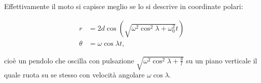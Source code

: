 \documentclass[../main.tex]{subfiles}
\begin{document}
Effettivamente il moto si capisce meglio se lo si descrive in coordinate polari:

\begin{align*}
	r &=  2d\cos\left(\sqrt{\omega^2\cos^2 \lambda + \omega^2_0} t\right)\\
	\theta &=  \omega\cos\lambda t,
\end{align*}

cioè un pendolo che oscilla con pulsazione $\sqrt{\omega^2\cos^2 \lambda + \frac{g}{l}}$ su un piano verticale
il quale ruota su se stesso con velocità angolare $\omega\cos\lambda$.
\end{document}
